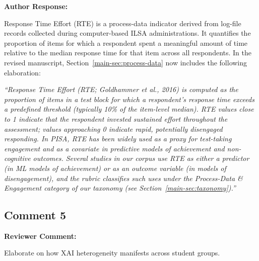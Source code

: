 \documentclass[12pt, a4paper]{article}
\newcommand{\R}[1]{Section~\ref{main-#1}}
\newenvironment{reviewercomment}{%
  \begin{mdframed}[linecolor=reviewercolor, linewidth=1.5pt,
    backgroundcolor=reviewercolor!6, innertopmargin=8pt, innerbottommargin=8pt]
  \color{reviewercolor}\textbf{Reviewer Comment:}\normalcolor\par\smallskip
}{%
  \end{mdframed}\medskip
}
\newenvironment{authorresponse}{%
  \begin{mdframed}[linecolor=authorcolor, linewidth=1pt,
    backgroundcolor=authorcolor!5, innertopmargin=8pt, innerbottommargin=8pt]
  \color{authorcolor}\textbf{Author Response:}\normalcolor\par\smallskip
}{%
  \end{mdframed}\bigskip
}
\newcommand{\changed}[1]{\textcolor{changedcolor}{\textit{#1}}}
\begin{document}
\begin{authorresponse}
Response Time Effort (RTE) is a process-data indicator derived from
log-file records collected during computer-based ILSA administrations.
It quantifies the proportion of items for which a respondent spent a
meaningful amount of time relative to the median response time for that
item across all respondents. In the revised manuscript, \R{sec:process-data}
now includes the following elaboration:

\changed{``Response Time Effort (RTE; Goldhammer et al., 2016) is computed
as the proportion of items in a test block for which a respondent's response
time exceeds a predefined threshold (typically 10\% of the item-level
median). RTE values close to 1 indicate that the respondent invested
sustained effort throughout the assessment; values approaching 0 indicate
rapid, potentially disengaged responding. In PISA, RTE has been widely used
as a proxy for test-taking engagement and as a covariate in predictive
models of achievement and non-cognitive outcomes. Several studies in our
corpus use RTE as either a predictor (in ML models of achievement) or as an
outcome variable (in models of disengagement), and the rubric classifies
such uses under the Process-Data \& Engagement category of our taxonomy
(see \R{sec:taxonomy}).''}
\end{authorresponse}

\subsection*{Comment 5}

\begin{reviewercomment}
Elaborate on how XAI heterogeneity manifests across student groups.
\end{reviewercomment}
\end{document}
